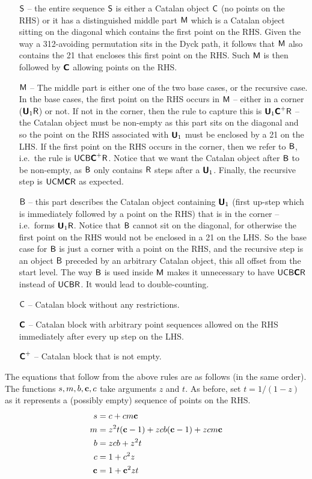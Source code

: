 \begin{enumerate}
\item[$\mathsf{S}$ --] the entire sequence $\mathsf{S}$ is either a Catalan object $\mathsf{C}$ (no points on the RHS) or it has a distinguished middle part $\mathsf{M}$ which is a Catalan object sitting on the diagonal which contains the first point on the RHS. Given the way a 312-avoiding permutation sits in the Dyck path, it follows that $\mathsf{M}$ also contains the 21 that encloses this first point on the RHS. Such $\mathsf{M}$ is then followed by $\textbf{\textsf{C}}$ allowing points on the RHS.
\item[$\mathsf{M}$ --] The middle part is either one of the two base cases, or the recursive case. In the base cases, the first point on the RHS occurs in $\mathsf{M}$ -- either in a corner ($\textbf{\textsf{U}}_1\mathsf{R}$) or not. If not in the corner, then the rule to capture this is $\textbf{\textsf{U}}_1\textbf{\textsf{C}}^+\mathsf{R}$ -- the Catalan object must be non-empty as this part sits on the diagonal and so the point on the RHS associated with $\textbf{\textsf{U}}_1$ must be enclosed by a 21 on the LHS. If the first point on the RHS occurs in the corner, then we refer to $\mathsf{B}$, i.e.~the rule is $\mathsf{U}\mathsf{C}\mathsf{B}\textbf{\textsf{C}}^+\mathsf{R}$. Notice that we want the Catalan object after $\mathsf{B}$ to be non-empty, as $\mathsf{B}$ only contains $\mathsf{R}$ steps after a $\textbf{\textsf{U}}_1$. Finally, the recursive step is $\mathsf{U}\mathsf{C}\mathsf{M}\textbf{\textsf{C}}\mathsf{R}$ as expected.
\item[$\mathsf{B}$ --] this part describes the Catalan object containing $\textbf{\textsf{U}}_1$ (first up-step which is immediately followed by a point on the RHS) that is in the corner -- i.e.~forms $\textbf{\textsf{U}}_1\mathsf{R}$. Notice that $\mathsf{B}$ cannot sit on the diagonal, for otherwise the first point on the RHS would not be enclosed in a 21 on the LHS. So the base case for $\mathsf{B}$ is just a corner with a point on the RHS, and the recursive step is an object $\mathsf{B}$ preceded by an arbitrary Catalan object, this all offset from the start level. The way $\mathsf{B}$ is used inside $\mathsf{M}$ makes it unnecessary to have $\mathsf{U}\mathsf{C}\mathsf{B}\textbf{\textsf{C}}\mathsf{R}$ instead of $\mathsf{U}\mathsf{C}\mathsf{B}\mathsf{R}$. It would lead to double-counting.
\item[$\mathsf{C}$ --] Catalan block without any restrictions.
\item[$\textbf{\textsf{C}}$ --] Catalan block with arbitrary point sequences allowed on the RHS immediately after every up step on the LHS. 
\item[$\textbf{\textsf{C}}^+$ --] Catalan block that is not empty.
\end{enumerate} 

\noindent The equations that follow from the above rules are as follows (in the same order). The functions $s, m, b, \mathbf{c}, c$ take arguments $z$ and $t$. As before, set $t = 1/(1-z)$ as it represents a (possibly empty) sequence of points on the RHS.
\begin{align*}
s &= c + cm\mathbf{c}\\
m &= z^2t(\mathbf{c} -1) + zcb(\mathbf{c} -1) + zcm\mathbf{c}\\
b &= zcb + z^2t\\
c &= 1 + c^2z\\
\mathbf{c} &= 1 + \mathbf{c}^2zt
\end{align*}

